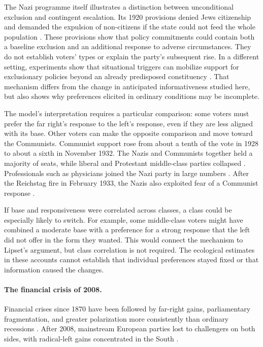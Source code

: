 \documentclass[12pt,letterpaper]{article}
\begin{document}
The Nazi programme itself illustrates a distinction between unconditional exclusion and contingent escalation. Its 1920 provisions denied Jews citizenship and demanded the expulsion of non-citizens if the state could not feed the whole population \citep{NSDAP1920}. These provisions show that policy commitments could contain both a baseline exclusion and an additional response to adverse circumstances. They do not establish voters' types or explain the party's subsequent rise. In a different setting, experiments show that situational triggers can mobilize support for exclusionary policies beyond an already predisposed constituency \citep{SnidermanHagendoornPrior2004}. That mechanism differs from the change in anticipated informativeness studied here, but also shows why preferences elicited in ordinary conditions may be incomplete.

The model's interpretation requires a particular comparison: some voters must prefer the far right's response to the left's response, even if they are less aligned with its base. Other voters can make the opposite comparison and move toward the Communists. Communist support rose from about a tenth of the vote in 1928 to about a sixth in November 1932. The Nazis and Communists together held a majority of seats, while liberal and Protestant middle-class parties collapsed \citep{Falter1991}. Professionals such as physicians joined the Nazi party in large numbers \citep{Kater1989}. After the Reichstag fire in February 1933, the Nazis also exploited fear of a Communist response \citep{Evans2003}.

If base and responsiveness were correlated across classes, a class could be especially likely to switch. For example, some middle-class voters might have combined a moderate base with a preference for a strong response that the left did not offer in the form they wanted. This would connect the mechanism to Lipset's argument, but class correlation is not required. The ecological estimates in these accounts cannot establish that individual preferences stayed fixed or that information caused the changes.

\paragraph{The financial crisis of 2008.}
Financial crises since 1870 have been followed by far-right gains, parliamentary fragmentation, and greater polarization more consistently than ordinary recessions \citep{Funke2016,Mian2014}. After 2008, mainstream European parties lost to challengers on both sides, with radical-left gains concentrated in the South \citep{Hernandez2016}.
\end{document}
